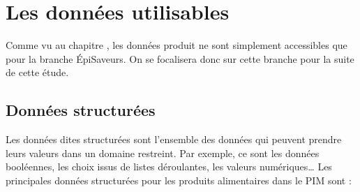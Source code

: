     \chapter{Les données utilisables}
        \large
        Comme vu au chapitre , les données produit ne sont simplement accessibles que pour la branche \'{E}piSaveurs.
        On se focalisera donc sur cette branche pour la suite de cette étude.
        \normalsize

        \section{Données structurées}

        Les données dites structurées sont l'ensemble des données qui peuvent prendre leurs valeurs dans un domaine restreint.
        Par exemple, ce sont les données booléennes, les choix issus de listes déroulantes, les valeurs numériques\dots
        Les principales données structurées pour les produits alimentaires dans le PIM sont : 
